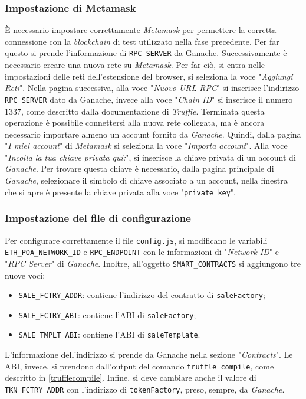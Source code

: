 \documentclass[a4paper]{article}
\begin{document}
        \subsubsection{Impostazione di Metamask}
        È necessario impostare correttamente \emph{Metamask} per permettere la corretta connessione con la \emph{blockchain} di test utilizzato nella fase precedente.
        Per far questo si prende l'informazione di \verb|RPC SERVER| da Ganache. Successivamente è necessario creare una nuova rete su \emph{Metamask}. Per far ciò, si entra nelle impostazioni delle reti dell'estensione del browser, si seleziona la voce "\emph{Aggiungi Reti}".
        Nella pagina successiva, alla voce "\emph{Nuovo URL RPC}" si inserisce l'indirizzo \verb|RPC SERVER| dato da Ganache, invece alla voce "\emph{Chain ID}" si inserisce il numero 1337, come descritto dalla documentazione di \emph{Truffle}\cite{trufflechain}.
        Terminata questa operazione è possibile connettersi alla nuova rete collegata, ma è ancora necessario importare almeno un account fornito da \emph{Ganache}. Quindi, dalla pagina "\emph{I miei account}" di \emph{Metamask} si seleziona la voce "\emph{Importa account}".
        Alla voce "\emph{Incolla la tua chiave privata qui:}", si inserisce la chiave privata di un account di \emph{Ganache}. Per trovare questa chiave è necessario, dalla pagina principale di \emph{Ganache}, selezionare il simbolo di chiave associato a un account, nella finestra che si apre è presente la chiave privata alla voce "\verb|private key|".
        \subsubsection{Impostazione del file di configurazione}
        Per configurare correttamente il file \verb|config.js|, si modificano le variabili \verb|ETH_POA_NETWORK_ID| e \verb|RPC_ENDPOINT| con le informazioni di "\emph{Network ID}" e "\emph{RPC Server}" di \emph{Ganache}.
        Inoltre, all'oggetto \verb|SMART_CONTRACTS| si aggiungono tre nuove voci:
        \begin{itemize}
          \item \verb|SALE_FCTRY_ADDR|: contiene l'indirizzo del contratto di \verb|saleFactory|;
          \item \verb|SALE_FCTRY_ABI|: contiene l'ABI di \verb|saleFactory|;
          \item \verb|SALE_TMPLT_ABI|: contiene l'ABI di \verb|saleTemplate|.
        \end{itemize}
        L'informazione dell'indirizzo si prende da Ganache nella sezione "\emph{Contracts}". Le ABI, invece, si prendono dall'output del comando \verb|truffle compile|, come descritto in \ref{trufflecompile}.
        \newline
        Infine, si deve cambiare anche il valore di \verb|TKN_FCTRY_ADDR| con l'indirizzo di \verb|tokenFactory|, preso, sempre, da \emph{Ganache}.
\end{document}
